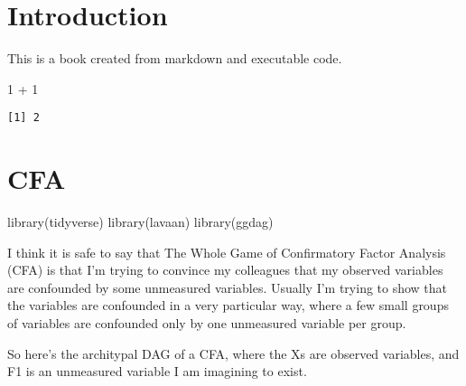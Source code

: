 \documentclass[
  letterpaper,
  DIV=11,
  numbers=noendperiod]{scrreprt}
\newenvironment{Shaded}{\begin{snugshade}}{\end{snugshade}}
\newcommand{\DecValTok}[1]{\textcolor[rgb]{0.68,0.00,0.00}{#1}}
\newcommand{\FunctionTok}[1]{\textcolor[rgb]{0.28,0.35,0.67}{#1}}
\newcommand{\NormalTok}[1]{\textcolor[rgb]{0.00,0.23,0.31}{#1}}
\newcommand{\SpecialCharTok}[1]{\textcolor[rgb]{0.37,0.37,0.37}{#1}}
\begin{document}

\hypertarget{introduction}{%
\chapter{Introduction}\label{introduction}}

This is a book created from markdown and executable code.

\begin{Shaded}
\begin{Highlighting}[]
\DecValTok{1} \SpecialCharTok{+} \DecValTok{1}
\end{Highlighting}
\end{Shaded}

\begin{verbatim}
[1] 2
\end{verbatim}


\hypertarget{cfa}{%
\chapter{CFA}\label{cfa}}

\begin{Shaded}
\begin{Highlighting}[]
\FunctionTok{library}\NormalTok{(tidyverse)}
\FunctionTok{library}\NormalTok{(lavaan)}
\FunctionTok{library}\NormalTok{(ggdag)}
\end{Highlighting}
\end{Shaded}

I think it is safe to say that The Whole Game of Confirmatory Factor
Analysis (CFA) is that I'm trying to convince my colleagues that my
observed variables are confounded by some unmeasured variables. Usually
I'm trying to show that the variables are confounded in a very
particular way, where a few small groups of variables are confounded
only by one unmeasured variable per group.

So here's the architypal DAG of a CFA, where the Xs are observed
variables, and F1 is an unmeasured variable I am imagining to exist.
\end{document}
